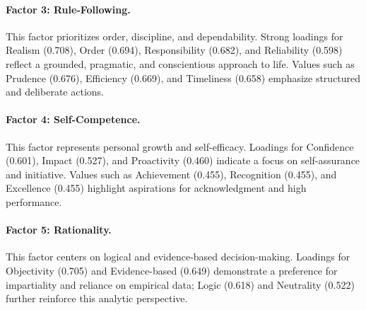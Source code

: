 \paragraph{Factor 3: Rule-Following.}
This factor prioritizes order, discipline, and dependability. Strong loadings for Realism (0.708), Order (0.694), Responsibility (0.682), and Reliability (0.598) reflect a grounded, pragmatic, and conscientious approach to life. Values such as Prudence (0.676), Efficiency (0.669), and Timeliness (0.658) emphasize structured and deliberate actions.

\paragraph{Factor 4: Self-Competence.}
This factor represents personal growth and self-efficacy. Loadings for Confidence (0.601), Impact (0.527), and Proactivity (0.460) indicate a focus on self-assurance and initiative. Values such as Achievement (0.455), Recognition (0.455), and Excellence (0.455) highlight aspirations for acknowledgment and high performance.

\paragraph{Factor 5: Rationality.}
This factor centers on logical and evidence-based decision-making. Loadings for Objectivity (0.705) and Evidence-based (0.649) demonstrate a preference for impartiality and reliance on empirical data; Logic (0.618) and Neutrality (0.522) further reinforce this analytic perspective.
 

